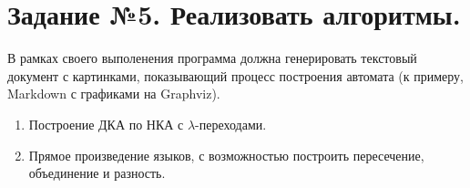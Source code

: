 \documentclass[a4paper]{article}
\begin{document}
\section{Задание №5. Реализовать алгоритмы.}
В рамках своего выполенения программа должна генерировать текстовый документ с картинками, показывающий процесс построения автомата (к примеру, Markdown с графиками на Graphviz).

\begin{enumerate}
	\item Построение ДКА по НКА с $\lambda$-переходами.
	\item Прямое произведение языков, с возможностью построить пересечение, объединение и разность.
\end{enumerate}
\end{document}
